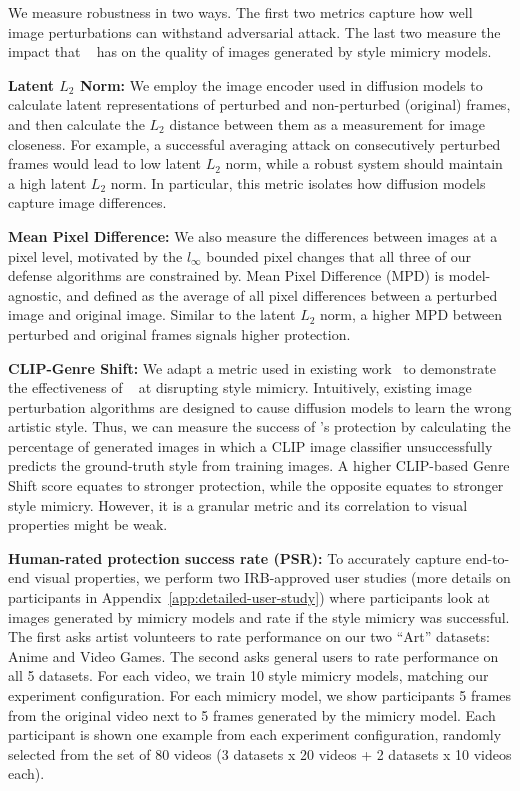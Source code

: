   We measure robustness in two ways. The first two metrics
capture how well image perturbations can withstand adversarial attack. The
last two measure the impact that \system~ has on the quality of images
generated by style mimicry models.
\begin{packed_itemize}
\item \textbf{Latent $L_2$ Norm:} We employ the image encoder used in
  diffusion models to calculate latent representations of perturbed and
  non-perturbed (original) frames, and then calculate the $L_2$ distance
  between them as a measurement for image closeness. For example, a
  successful averaging attack on consecutively perturbed frames would lead to
  low latent $L_2$ norm, while a robust system should maintain a high latent
  $L_2$ norm. In particular, this metric isolates how diffusion models
  capture image differences. 
\item \textbf{Mean Pixel Difference:} We also measure the differences between
  images at a pixel level, motivated by the $l_{\infty}$ bounded pixel
  changes that all three of our defense algorithms are constrained by. Mean
  Pixel Difference (MPD) is model-agnostic, and defined as the average of all
  pixel differences between a perturbed image and original image. Similar to
  the latent $L_2$ norm, a higher MPD between perturbed and original frames
  signals higher protection.
\item \textbf{CLIP-Genre Shift:} We adapt a metric used in existing
  work~\cite{shan2023glaze} to demonstrate the effectiveness
  of \system~ at disrupting style mimicry. Intuitively, existing image
  perturbation algorithms are designed to cause diffusion models to learn the
  wrong artistic style. Thus, we can measure the success of \system's
  protection by calculating the percentage of generated images in which a
  CLIP image classifier unsuccessfully predicts the ground-truth style from
  training images. A higher CLIP-based Genre Shift score equates to stronger
  protection, while the opposite equates to stronger style mimicry. However, it 
  is a granular metric and its correlation to visual properties might be weak.
\item \textbf{Human-rated protection success rate (PSR):} To accurately capture 
  end-to-end visual properties, we perform
  two IRB-approved user studies (more details on participants in
  Appendix~\ref{app:detailed-user-study}) where participants look at images
  generated by 
  mimicry models and rate if the style mimicry was successful. The first asks
  artist volunteers to 
  rate performance on our two ``Art'' datasets: Anime and Video Games. The
  second asks general users to rate performance on all 5 datasets. For
  each video, we train 10 style mimicry models, matching our experiment
  configuration. For each mimicry model, we show participants 5 frames from
  the original video next to 5 frames generated by the mimicry model. Each
  participant is shown one example from each experiment configuration,
  randomly selected from the set of 80 videos (3 datasets x 20 videos + 2
  datasets x 10 videos each).


\end{packed_itemize}
